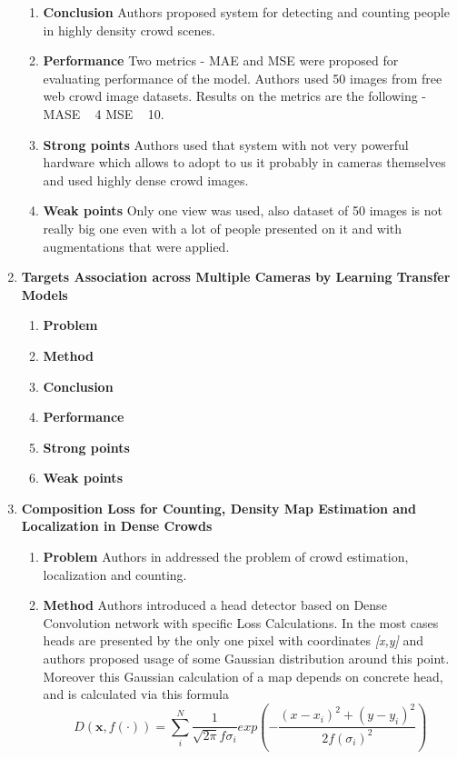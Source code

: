 \begin{enumerate}
\begin{enumerate}
        \item \textbf{Conclusion}
        Authors proposed system for detecting and counting people in highly density crowd scenes. 
        \item \textbf{Performance}
        Two metrics - MAE and MSE were proposed for evaluating performance of the model. Authors used 50 images from free web crowd image datasets.
        Results on the metrics are the following - MASE ~ 4 MSE ~ 10. 
        \item \textbf{Strong points}
        Authors used that system with not very powerful hardware which allows to adopt to us it probably in cameras themselves and used highly dense crowd images.
        \item \textbf{Weak points}
        Only one view was used, also dataset of 50 images is not really big one even with a lot of people presented on it and with augmentations that were applied. 
    \end{enumerate}
    \item \textbf{Targets Association across Multiple Cameras by Learning Transfer Models}
    \begin{enumerate}
        \item \textbf{Problem}
        \item \textbf{Method}
        \item \textbf{Conclusion}
        \item \textbf{Performance}
        \item \textbf{Strong points}
        \item \textbf{Weak points}
    \end{enumerate}
    \item \textbf{Composition Loss for Counting, Density Map Estimation and Localization in Dense Crowds}
    \begin{enumerate}
        \item \textbf{Problem}
        Authors in \cite{idrees2018composition} addressed the problem of crowd estimation, localization and counting. 
        \item \textbf{Method}
        Authors introduced a head detector based on Dense Convolution network with specific Loss Calculations. In the most cases heads are presented by the only one pixel with coordinates \textit{[x,y]} and authors proposed usage of some Gaussian distribution around this point. Moreover this Gaussian calculation of a map depends on concrete head, and is calculated via this formula
        \[D(\mathbf{x},f(\cdot)) = \sum_i^N{\dfrac{1}{\sqrt{2\pi}f\sigma_i}exp(-\dfrac{(\mathit{x} - \mathit{x_i})^2 + (\mathit{y}-\mathit{y_i})^2}{2f(\sigma_i)^2})}\]

\end{enumerate}
\end{enumerate}
